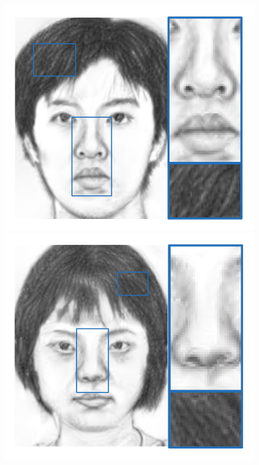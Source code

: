 \documentclass[10pt,twocolumn,letterpaper]{article}
\begin{document}
\begin{figure}[htbp]
\begin{minipage}[t]{0.138\linewidth}
\includegraphics[width=0.99\linewidth]{img/example1_ours.pdf}
\includegraphics[width=0.99\linewidth]{img/example2_ours.pdf}

\end{minipage}
\end{figure}
\end{document}
